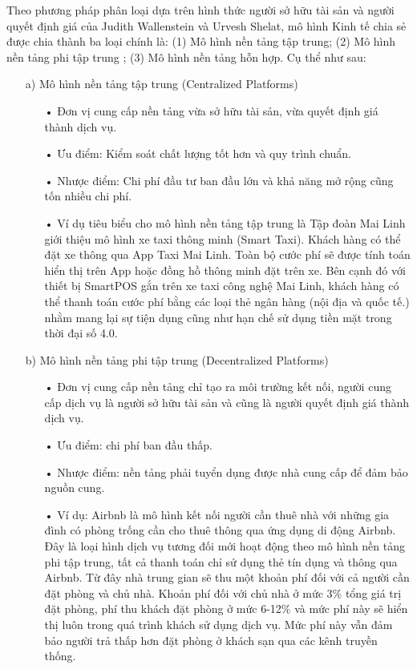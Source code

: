 \documentclass[12pt,a4paper]{report}
\begin{document}
Theo phương pháp phân loại dựa trên hình thức người sở hữu tài sản và người quyết định giá của Judith Wallenstein và Urvesh Shelat, mô hình Kinh tế chia sẻ được chia
thành ba loại chính là: (1) Mô hình nền tảng tập trung; (2) Mô hình nền tảng phi tập
trung ; (3) Mô hình nền tảng hỗn hợp. Cụ thể như sau:
\begin{itemize}
\item[a)] Mô hình nền tảng tập trung (Centralized Platforms)
\begin{itemize}
\item[•] Đơn vị cung cấp nền tảng vừa sở hữu tài sản, vừa quyết định giá thành dịch vụ.
\item[•] Ưu điểm: Kiểm soát chất lượng tốt hơn và quy trình chuẩn.
\item[•] Nhược điểm: Chi phí đầu tư ban đầu lớn và khả năng mở rộng cũng tốn nhiều chi phí.
\item[•] Ví dụ tiêu biểu cho mô hình nền tảng tập trung là Tập đoàn Mai Linh giới thiệu mô hình xe taxi thông minh (Smart Taxi). Khách hàng có thể đặt xe thông qua App Taxi Mai Linh. Toàn bộ cước phí sẽ được tính toán hiển thị trên App hoặc đồng hồ thông minh đặt trên xe. Bên cạnh đó với thiết bị SmartPOS gắn trên xe taxi công nghệ Mai Linh, khách hàng có thể thanh toán cước phí bằng các loại thẻ ngân hàng (nội địa và quốc tế.) nhằm mang lại sự tiện dụng cũng như hạn chế sử dụng tiền mặt trong thời đại số 4.0. 
\end{itemize}
\item[b)] Mô hình nền tảng phi tập trung (Decentralized Platforms)
\begin{itemize}
\item[•] Đơn vị cung cấp nền tảng chỉ tạo ra môi trường kết nối, người cung cấp dịch vụ là người sở hữu tài sản và cũng là người quyết định giá thành dịch vụ.
\item[•] Ưu điểm: chi phí ban đầu thấp.
\item[•] Nhược điểm: nền tảng phải tuyển dụng được nhà cung cấp để đảm bảo nguồn cung.
\item[•] Ví dụ: Airbnb là mô hình kết nối người cần thuê nhà với những gia đình có phòng trống cần cho thuê thông qua ứng dụng di động Airbnb. Đây là loại hình dịch vụ tương đối mới hoạt động theo mô hình nền tảng phi tập trung, tất cả thanh toán chỉ sử dụng thẻ tín dụng và thông qua Airbnb. Từ đây nhà trung gian sẽ thu một khoản phí đối với cả người cần đặt phòng và chủ nhà. Khoản phí đối với chủ nhà ở mức 3$\%$ tổng giá trị đặt phòng, phí thu khách đặt phòng ở mức 6-12$\%$ và mức phí này sẽ hiển thị luôn trong quá trình khách sử dụng dịch vụ. Mức phí này vẫn đảm bảo người trả thấp hơn đặt phòng ở khách sạn qua các kênh truyền thống.

\end{itemize}
\end{itemize}
\end{document}

